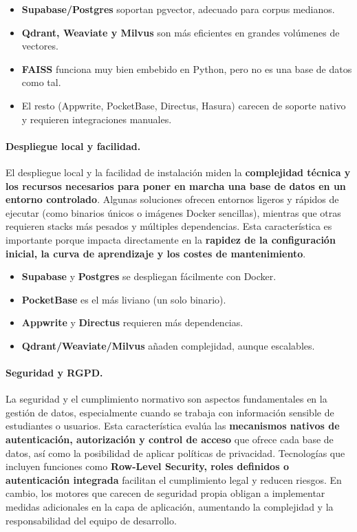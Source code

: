 \begin{itemize}
    \item \textbf{Supabase/Postgres} soportan pgvector, adecuado para corpus medianos.
    \item \textbf{Qdrant, Weaviate y Milvus} son más eficientes en grandes volúmenes de vectores.
    \item \textbf{FAISS} funciona muy bien embebido en Python, pero no es una base de datos como tal.
    \item El resto (Appwrite, PocketBase, Directus, Hasura) carecen de soporte nativo y requieren integraciones manuales.
\end{itemize}

\paragraph{Despliegue local y facilidad.}

El despliegue local y la facilidad de instalación miden la \textbf{complejidad técnica y los recursos necesarios para poner en marcha una base de datos en un entorno controlado}. Algunas soluciones ofrecen entornos ligeros y rápidos de ejecutar (como binarios únicos o imágenes Docker sencillas), mientras que otras requieren stacks más pesados y múltiples dependencias. Esta característica es importante porque impacta directamente en la \textbf{rapidez de la configuración inicial, la curva de aprendizaje y los costes de mantenimiento}.

\begin{itemize}
    \item \textbf{Supabase} y \textbf{Postgres} se despliegan fácilmente con Docker.
    \item \textbf{PocketBase} es el más liviano (un solo binario).
    \item \textbf{Appwrite} y \textbf{Directus} requieren más dependencias.
    \item \textbf{Qdrant/Weaviate/Milvus} añaden complejidad, aunque escalables.
\end{itemize}

\paragraph{Seguridad y RGPD.}

La seguridad y el cumplimiento normativo son aspectos fundamentales en la gestión de datos, especialmente cuando se trabaja con información sensible de estudiantes o usuarios. Esta característica evalúa las \textbf{mecanismos nativos de autenticación, autorización y control de acceso} que ofrece cada base de datos, así como la posibilidad de aplicar políticas de privacidad. Tecnologías que incluyen funciones como \textbf{Row-Level Security, roles definidos o autenticación integrada} facilitan el cumplimiento legal y reducen riesgos. En cambio, los motores que carecen de seguridad propia obligan a implementar medidas adicionales en la capa de aplicación, aumentando la complejidad y la responsabilidad del equipo de desarrollo.

